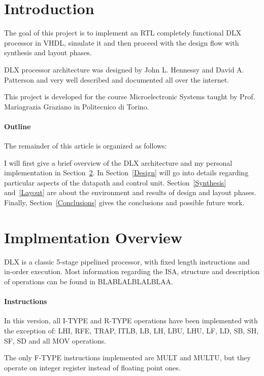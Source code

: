 \documentclass[12pt]{article}
\begin{document}
\maketitle
\tableofcontents

\section{Introduction}
The goal of this project is to implement an RTL completely functional DLX processor in VHDL, simulate it and then proceed with the design flow with synthesis and layout phases.

DLX processor architecture was designed by John L. Hennessy and David A. Patterson and very well described and documented all over the internet.

This project is developed for the course Microelectronic Systems taught by Prof. Mariagrazia Graziano in Politecnico di Torino.



\paragraph{Outline}
The remainder of this article is organized as follows:
 
I will first give a brief overview of the DLX architecture and my personal implementation in Section~\ref{Overview}.
In Section~\ref{Design} will go into details regarding particular aspects of the datapath and control unit.
Section~\ref{Synthesis} and~\ref{Layout} are about the environment and results of design and layout phases.
Finally, Section~\ref{Conclusions} gives the conclusions and possible future work.

\section{Implmentation Overview}\label{Overview}
DLX is a classic 5-stage pipelined processor, with fixed length instructions and in-order execution.
Most information regarding the ISA, structure and description of operations can be found in BLABLALBLALBLAA.
\paragraph{Instructions}
In this version, all I-TYPE and R-TYPE operations have been implemented with the exception of: LHI, RFE, TRAP, ITLB, LB, LH, LBU, LHU, LF, LD, SB, SH, SF, SD and all MOV operations.

The only F-TYPE instructions implemented are MULT and MULTU, but they operate on integer register instead of floating point ones.
\end{document}
